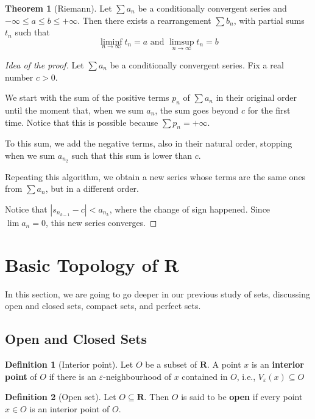 \documentclass[12pt,a4paper]{article}
\theoremstyle{definition}
\newtheorem{theorem}{Theorem}[section]
\newtheorem{definition}{Definition}[section]
\begin{document}
\begin{theorem}[Riemann]
	Let $\sum a_n$ be a conditionally convergent series and $- \infty \leq a \leq b \leq + \infty$. Then there exists a rearrangement $\sum b_n$, with partial sums $t_n$ such that
	\[
		\liminf_{n \to \infty} t_n = a \text{ and } \limsup_{n \to \infty} t_n = b
	\]
\end{theorem}

\begin{proof}[Idea of the proof]
	Let $\sum a_n$ be a conditionally convergent series. Fix a real number $c > 0$.
	
	We start with the sum of the positive terms $p_n$ of $\sum a_n$ in their original order until the moment that, when we sum $a_n$, the sum goes beyond $c$ for the first time. Notice that this is possible because $\sum p_n = + \infty$.
	
	To this sum, we add the negative terms, also in their natural order, stopping when we sum $a_{n_2}$ such that this sum is lower than $c$.
	
	Repeating this algorithm, we obtain a new series whose terms are the same ones from $\sum a_n$, but in a different order.
	
	Notice that $|s_{n_{k-1}} - c| < a_{n_k}$, where the change of sign happened. Since $\lim a_n = 0$, this new series converges.
\end{proof}

\newpage
\section{Basic Topology of \textbf{R}}

In this section, we are going to go deeper in our previous study of sets, discussing open and closed sets, compact sets, and perfect sets.

\subsection{Open and Closed Sets}

\begin{definition}[Interior point]
	Let $O$ be a subset of $\textbf{R}$. A point $x$ is an \textbf{interior point} of $O$ if there is an $\varepsilon$-neighbourhood of $x$ contained in $O$, i.e., $V_{\varepsilon}(x) \subseteq O$ 
\end{definition}

\begin{definition}[Open set]
	Let $O \subseteq \textbf{R}$. Then $O$ is said to be \textbf{open} if every point $x \in O$ is an interior point of $O$.
\end{definition}
\end{document}
